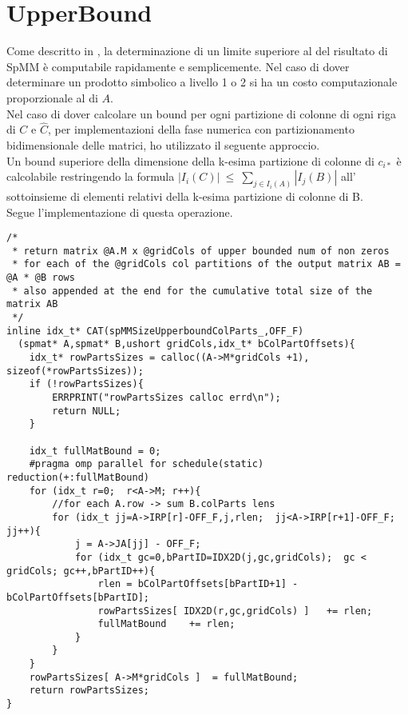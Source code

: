 \section{UpperBound} \label{chSpMMSymb:UpperBound}
Come descritto in , la determinazione di un limite superiore al \nnnz 
del risultato di SpMM è computabile rapidamente e semplicemente.
\voidLine
Nel caso di dover determinare un prodotto simbolico a livello 1 o 2 %
si ha un costo computazionale proporzionale al \nnnz di $A$.\\
\voidLine
Nel caso di dover calcolare un bound per ogni partizione di colonne di ogni riga di $C$ e $\hat{C}$,
per implementazioni della fase numerica con partizionamento bidimensionale delle matrici, ho utilizzato
il seguente approccio.\\
Un bound superiore della dimensione della k-esima partizione di colonne di $c_{i*}$ 
è calcolabile restringendo la formula $ | I_i(C) |~\leq~\sum\limits_{ j \in I_i(A) }  | I_j(B) | $
all' sottoinsieme di elementi \nnz relativi della k-esima partizione di colonne di B.\\
Segue l'implementazione di questa operazione.\\
\begin{lstlisting}
/* 
 * return matrix @A.M x @gridCols of upper bounded num of non zeros
 * for each of the @gridCols col partitions of the output matrix AB = @A * @B rows
 * also appended at the end for the cumulative total size of the matrix AB 
 */
inline idx_t* CAT(spMMSizeUpperboundColParts_,OFF_F)
  (spmat* A,spmat* B,ushort gridCols,idx_t* bColPartOffsets){
    idx_t* rowPartsSizes = calloc((A->M*gridCols +1),  sizeof(*rowPartsSizes));
    if (!rowPartsSizes){
        ERRPRINT("rowPartsSizes calloc errd\n");
        return NULL;
    }

    idx_t fullMatBound = 0;
    #pragma omp parallel for schedule(static) reduction(+:fullMatBound)
    for (idx_t r=0;  r<A->M; r++){
        //for each A.row -> sum B.colParts lens     
        for (idx_t jj=A->IRP[r]-OFF_F,j,rlen;  jj<A->IRP[r+1]-OFF_F; jj++){
            j = A->JA[jj] - OFF_F;
            for (idx_t gc=0,bPartID=IDX2D(j,gc,gridCols);  gc < gridCols; gc++,bPartID++){
                rlen = bColPartOffsets[bPartID+1] - bColPartOffsets[bPartID];
                rowPartsSizes[ IDX2D(r,gc,gridCols) ]   += rlen;
                fullMatBound    += rlen;
            }
        }
    }
    rowPartsSizes[ A->M*gridCols ]  = fullMatBound;
    return rowPartsSizes;
}
\end{lstlisting}
